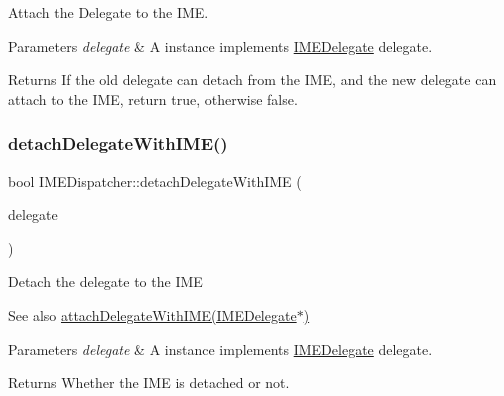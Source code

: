 Attach the Delegate to the I\+ME. 


\begin{DoxyParams}{Parameters}
{\em delegate} & A instance implements \hyperlink{classIMEDelegate}{I\+M\+E\+Delegate} delegate. \\
\hline
\end{DoxyParams}
\begin{DoxyReturn}{Returns}
If the old delegate can detach from the I\+ME, and the new delegate can attach to the I\+ME, return true, otherwise false. 
\end{DoxyReturn}
\mbox{\label{classIMEDispatcher_a091237af7143044d6d06638db88cfdde}} 
\subsubsection{\texorpdfstring{detach\+Delegate\+With\+I\+M\+E()}{detachDelegateWithIME()}\hspace{0.1cm}{\footnotesize\ttfamily [1/2]}}
{\footnotesize\ttfamily bool I\+M\+E\+Dispatcher\+::detach\+Delegate\+With\+I\+ME (\begin{DoxyParamCaption}\item[{\hyperlink{classIMEDelegate}{I\+M\+E\+Delegate} $\ast$}]{delegate }\end{DoxyParamCaption})\hspace{0.3cm}{\ttfamily [protected]}}

Detach the delegate to the I\+ME \begin{DoxySeeAlso}{See also}
{\ttfamily \hyperlink{classIMEDispatcher_a5d08b8699ff78fb42b065b4030f8ea11}{attach\+Delegate\+With\+I\+M\+E(\+I\+M\+E\+Delegate$\ast$)}} 
\end{DoxySeeAlso}

\begin{DoxyParams}{Parameters}
{\em delegate} & A instance implements \hyperlink{classIMEDelegate}{I\+M\+E\+Delegate} delegate. \\
\hline
\end{DoxyParams}
\begin{DoxyReturn}{Returns}
Whether the I\+ME is detached or not. 
\end{DoxyReturn}
\mbox{\label{classIMEDispatcher_a091237af7143044d6d06638db88cfdde}} 
